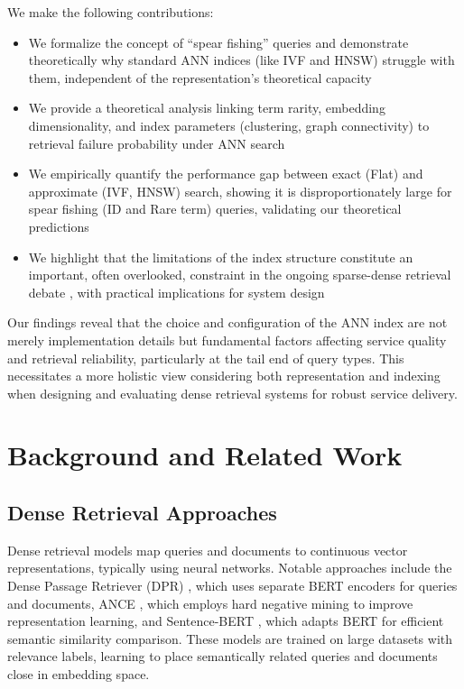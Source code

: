 \documentclass[conference,anonymous]{IEEEtran}
\begin{document}
We make the following contributions:
\begin{itemize}
    \item We formalize the concept of ``spear fishing'' queries and demonstrate theoretically why standard ANN indices (like IVF and HNSW) struggle with them, independent of the representation's theoretical capacity
    
    \item We provide a theoretical analysis linking term rarity, embedding dimensionality, and index parameters (clustering, graph connectivity) to retrieval failure probability under ANN search
    
    \item We empirically quantify the performance gap between exact (Flat) and approximate (IVF, HNSW) search, showing it is disproportionately large for spear fishing (ID and Rare term) queries, validating our theoretical predictions
    
    \item We highlight that the limitations of the index structure constitute an important, often overlooked, constraint in the ongoing sparse-dense retrieval debate \cite{lin2024dense}, with practical implications for system design
\end{itemize}

Our findings reveal that the choice and configuration of the ANN index are not merely implementation details but fundamental factors affecting service quality and retrieval reliability, particularly at the tail end of query types. This necessitates a more holistic view considering both representation and indexing when designing and evaluating dense retrieval systems for robust service delivery.

\section{Background and Related Work}

\subsection{Dense Retrieval Approaches}
Dense retrieval models map queries and documents to continuous vector representations, typically using neural networks. Notable approaches include the Dense Passage Retriever (DPR) \cite{karpukhin2020dense}, which uses separate BERT encoders for queries and documents, ANCE \cite{xiong2021approximate}, which employs hard negative mining to improve representation learning, and Sentence-BERT \cite{reimers2019sentencebert}, which adapts BERT for efficient semantic similarity comparison. These models are trained on large datasets with relevance labels, learning to place semantically related queries and documents close in embedding space.
\end{document}
